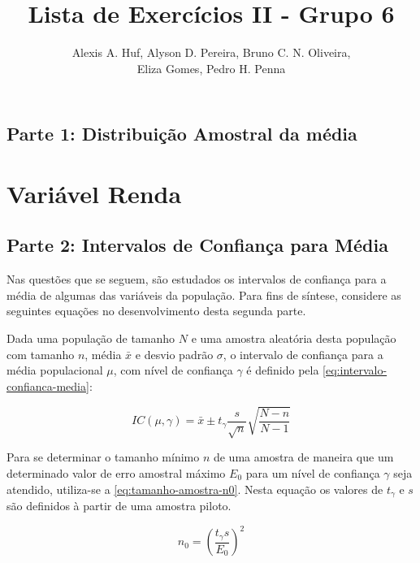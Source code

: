 \documentclass[10pt,a4paper,oneside]{article}
\author{%
	Alexis A. Huf, %
	Alyson D. Pereira, %
	Bruno C. N. Oliveira,\\%
	Eliza Gomes, %
	Pedro H. Penna
	}
\title{Lista de Exercícios II - Grupo 6}
\begin{document}
\maketitle

\begin{center}
	\section*{Parte 1: Distribuição Amostral da média}
\end{center}

\section{Variável Renda}
\label{questao:1}


\begin{center}
	\section*{Parte 2: Intervalos de Confiança para Média}
\end{center}

	Nas questões que se seguem, são estudados os intervalos de confiança
	para a média de algumas das variáveis da população. Para fins de síntese,
	considere as seguintes equações no desenvolvimento desta segunda parte.

	Dada uma população de tamanho $N$ e uma amostra aleatória desta população
	com tamanho $n$, média $\bar{x}$ e desvio padrão $\sigma$, o intervalo de 
	confiança para a média populacional $\mu$, com nível de confiança $\gamma$
	é definido pela \autoref{eq:intervalo-confianca-media}:

	\begin{equation}
		\label{eq:intervalo-confianca-media}
		IC (\mu, \gamma) = \bar{x} \pm t_\gamma \frac{s}{\sqrt{n}} \sqrt{\frac{N-n}{N-1}}
	\end{equation}

	Para se determinar o tamanho mínimo $n$ de uma amostra de maneira que
	um determinado valor de erro amostral máximo $E_{0}$ para um nível de
	confiança $\gamma$ seja atendido, utiliza-se a \autoref{eq:tamanho-amostra-n0}.
	Nesta equação os valores de $t_{\gamma}$ e $s$ são definidos à partir
	de uma amostra piloto.

	\begin{equation}
		\label{eq:tamanho-amostra-n0}
		 n_0 = \left (\frac{t_\gamma s}{E_0} \right)^2
	\end{equation}
\end{document}
